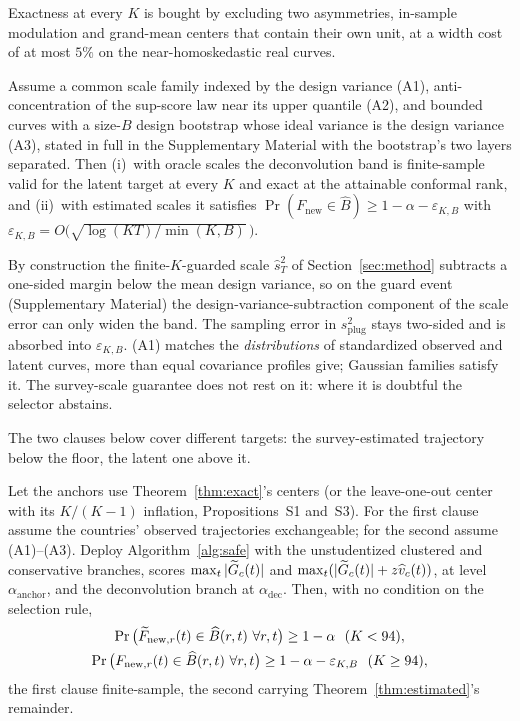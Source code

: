 Exactness at every $K$ is bought by excluding two asymmetries, in-sample
modulation and grand-mean centers that contain their own unit, at a width
cost of at most $5\%$ on the near-homoskedastic real curves.

\begin{theorem}\label{thm:estimated}
Assume a common scale family indexed by the design variance (A1),
anti-concentration of the sup-score law near its upper quantile (A2), and
bounded curves with a size-$B$ design bootstrap whose ideal variance is the
design variance (A3), stated in full in the Supplementary Material with the
bootstrap's two layers separated. Then (i)~with oracle scales the deconvolution band
is finite-sample valid for the latent target at every $K$ and exact at the
attainable conformal rank, and (ii)~with
estimated scales it satisfies
$\Pr(F_{\text{new}}\in\widehat B)\ge 1-\alpha-\varepsilon_{K,B}$ with
$\varepsilon_{K,B}=O\big(\sqrt{\log(KT)/\min(K,B)}\,\big)$.
\end{theorem}

By construction the finite-$K$-guarded scale
$\widehat s_T^2$ of Section~\ref{sec:method} subtracts a one-sided margin
below the mean design variance, so on the guard event (Supplementary
Material) the design-variance-subtraction component of the scale error can
only widen the band. The sampling error in $s_{\mathrm{plug}}^2$ stays
two-sided and is absorbed into $\varepsilon_{K,B}$. (A1) matches the
\emph{distributions} of standardized observed and latent curves, more than
equal covariance profiles give; Gaussian families satisfy it. The
survey-scale guarantee does not rest on it: where it is doubtful the selector
abstains.

The two clauses below cover different targets: the survey-estimated
trajectory below the floor, the latent one above it.

\begin{theorem}\label{thm:safe}
Let the anchors use Theorem~\ref{thm:exact}'s centers (or the leave-one-out
center with its $K/(K{-}1)$ inflation, Propositions~S1 and~S3). For the
first clause assume the countries' observed trajectories exchangeable; for
the second assume (A1)--(A3). Deploy Algorithm~\ref{alg:safe} with the
unstudentized clustered and conservative branches, scores
$\max_t|\widetilde{G}_c(t)|$ and $\max_t(|\widetilde{G}_c(t)|+z\widehat v_c(t))$,
at level $\alpha_{\text{anchor}}$,
and the deconvolution branch at $\alpha_{\text{dec}}$. Then, with no
condition on the selection rule,
\begin{gather*}
\Pr\big(\widetilde{F}_{\text{new},r}(t)\in\widehat B(r,t)\ \forall r,t\big)\ge1-\alpha\ \ (K<94),\\
\Pr\big(F_{\text{new},r}(t)\in\widehat B(r,t)\ \forall r,t\big)\ge1-\alpha-\varepsilon_{K,B}\ \
(K\ge94),
\end{gather*}
the first clause finite-sample, the second carrying
Theorem~\ref{thm:estimated}'s remainder.
\end{theorem}


